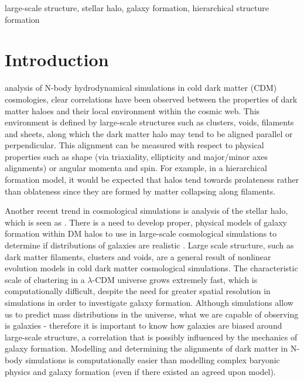\documentclass[journal]{IEEEtran}
\begin{document}
\begin{IEEEkeywords}
large-scale structure, stellar halo, galaxy formation, hierarchical structure formation
\end{IEEEkeywords}

\IEEEpeerreviewmaketitle

\section{Introduction}
 analysis of N-body hydrodynamical simulations in cold dark matter (CDM) cosmologies, clear correlations have been observed between the properties of dark matter haloes and their local environment within the cosmic web. This environment is defined by large-scale structures such as clusters, voids, filaments and sheets, along which the dark matter halo may tend to be aligned parallel or perpendicular. This alignment can be measured with respect to physical properties such as shape (via triaxiality, ellipticity and major/minor axes alignments) or angular momenta and spin. For example, in a hierarchical formation model, it would be expected that halos tend towards prolateness rather than oblateness \cite{bett07} since they are formed by matter collapsing along filaments. 

Another recent trend in cosmological simulations is analysis of the stellar halo, which is seen as . There is a need to develop proper, physical models of galaxy formation within DM halos to use in large-scale cosmological simulations to determine if distributions of galaxies are realistic \cite{davis85}. Large scale structure, such as dark matter filaments, clusters and voids, are a general result of nonlinear evolution models in cold dark matter cosmological simulations. The characteristic scale of clustering in a $\lambda$-CDM universe grows extremely fast, which is computationally difficult, despite the need for greater spatial resolution in simulations in order to investigate galaxy formation. Although simulations allow us to predict mass distributions in the universe, what we are capable of observing is galaxies - therefore it is important to know how galaxies are biased around large-scale structure, a correlation that is possibly influenced by the mechanics of galaxy formation. Modelling and determining the alignments of dark matter in N-body simulations is computationally easier than modelling complex baryonic physics and galaxy formation (even if there existed an agreed upon model). 
\end{document}
